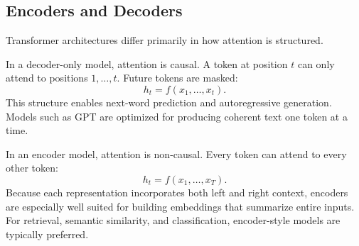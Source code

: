 \bigskip
\subsection{Encoders and Decoders}
\medskip

Transformer architectures differ primarily in how attention is structured.

In a decoder-only model, attention is causal. A token at position $t$ can only attend to positions $1, \dots, t$. Future tokens are masked:
\[
h_t = f(x_1, \dots, x_t).
\]
This structure enables next-word prediction and autoregressive generation. Models such as GPT are optimized for producing coherent text one token at a time.

In an encoder model, attention is non-causal. Every token can attend to every other token:
\[
h_t = f(x_1, \dots, x_T).
\]
Because each representation incorporates both left and right context, encoders are especially well suited for building embeddings that summarize entire inputs. For retrieval, semantic similarity, and classification, encoder-style models are typically preferred.

\bigskip

